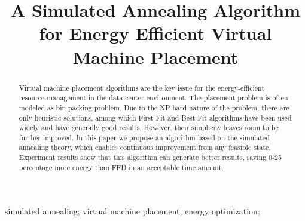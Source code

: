 \documentclass[10pt, conference, compsocconf]{IEEEtran}
\begin{document}
\setcounter{page}{1}
\pagestyle{plain}

\title{A Simulated Annealing Algorithm for Energy Efficient Virtual Machine Placement }



\author{
 \and
{}
 }


\maketitle


\begin{abstract}
Virtual machine placement algorithms are the key issue for the energy-efficient
resource management in the data center environment. The placement problem is
often modeled as bin packing problem. Due to the NP hard nature of the problem,
there are only heuristic solutions, among which First Fit and Best Fit
algorithms have been used widely and have generally good results. However, their
simplicity leaves room to be further improved. In this paper we propose an
algorithm based on the simulated annealing theory, which enables continuous
improvement from any feasible state. Experiment results show that this
algorithm can generate better results, saving 0-25 percentage more energy than
FFD in an acceptable time amount.

\end{abstract}

\begin{IEEEkeywords}
simulated annealing; virtual machine placement; energy optimization;

\end{IEEEkeywords}
\end{document}
